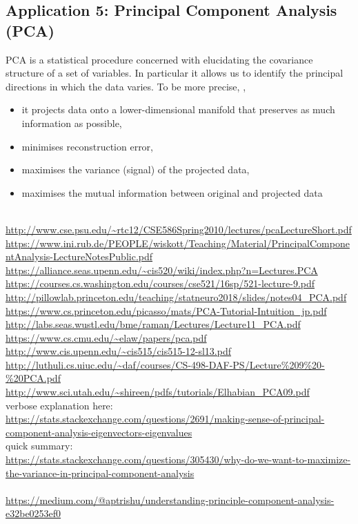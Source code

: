 \documentclass[a4paper]{article}
\numberwithin{equation}{section} %
\newcommand{\TODO}[1][]{%
\ifthenelse{\equal{#1}{}}{\textcolor{red}{\bf TODO!}\;}{\textcolor{red}{\textbf {TODO:} #1}\; }%
}
\begin{document}
\subsection{Application 5: Principal Component Analysis (PCA)}

PCA is a statistical procedure concerned with elucidating the covariance structure of a set of variables. In particular it allows us to identify the principal directions in which the data varies. To be more precise, \cite{lec_notes_gillies},
\begin{itemize}
    \item it projects data onto a lower-dimensional manifold that preserves as much information as possible,
    \item minimises reconstruction error,
    \item maximises the variance (signal) of the projected data,
    \item maximises the mutual information between original and projected data
\end{itemize}


\TODO \\
\url{http://www.cse.psu.edu/~rtc12/CSE586Spring2010/lectures/pcaLectureShort.pdf}\\
\url{https://www.ini.rub.de/PEOPLE/wiskott/Teaching/Material/PrincipalComponentAnalysis-LectureNotesPublic.pdf}\\
\url{https://alliance.seas.upenn.edu/~cis520/wiki/index.php?n=Lectures.PCA}\\
\url{https://courses.cs.washington.edu/courses/cse521/16sp/521-lecture-9.pdf}\\
\url{http://pillowlab.princeton.edu/teaching/statneuro2018/slides/notes04_PCA.pdf}\\
\url{https://www.cs.princeton.edu/picasso/mats/PCA-Tutorial-Intuition_jp.pdf} \\
\url{http://labs.seas.wustl.edu/bme/raman/Lectures/Lecture11_PCA.pdf}\\
\url{https://www.cs.cmu.edu/~elaw/papers/pca.pdf}\\
\url{http://www.cis.upenn.edu/~cis515/cis515-12-sl13.pdf}\\
\url{http://luthuli.cs.uiuc.edu/~daf/courses/CS-498-DAF-PS/Lecture\%209\%20-\%20PCA.pdf} \\
\url{http://www.sci.utah.edu/~shireen/pdfs/tutorials/Elhabian_PCA09.pdf} \\
verbose explanation here: \\
\url{https://stats.stackexchange.com/questions/2691/making-sense-of-principal-component-analysis-eigenvectors-eigenvalues} \\
quick summary:\\
\url{https://stats.stackexchange.com/questions/305430/why-do-we-want-to-maximize-the-variance-in-principal-component-analysis}\\
\quad \\
\url{https://medium.com/@aptrishu/understanding-principle-component-analysis-e32be0253ef0}\\
\end{document}
